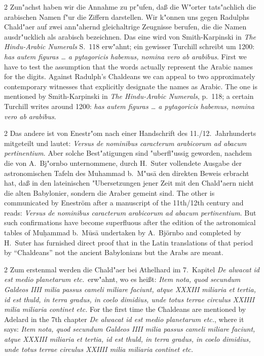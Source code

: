 \documentclass[10pt,a4paper]{article}
\renewcommand{\switchcolumn}{\syncronize\nointerlineskip\columnbreak}
\begin{document}
\begin{paracol}{2}
Zun"achst haben wir die Annahme zu pr"ufen, da\ss{} die W"orter tats"achlich die arabischen Namen f"ur die Ziffern darstellen. Wir k"onnen uns gegen Radulphs Chald"aer auf zwei ann"ahernd gleichaltrige Zeugnisse berufen, die die Namen ausdr"ucklich als arabisch bezeichnen. Das eine wird von Smith-Karpinski in \textit{The Hindu-Arabic Numerals} S.\ 118 erw"ahnt; ein gewisser Turchill schreibt um 1200: \textit{has autem figuras \ldots{} a pytagoricis habemus, nomina vero ab arabibus}.
\switchcolumn
First we have to test the assumption that the words actually represent the Arabic names for the digits. Against Radulph's Chaldeans we can appeal to two approximately contemporary witnesses that explicitly designate the names as Arabic. The one is mentioned by Smith-Karpinski in \textit{The Hindu-Arabic Numerals}, p.\ 118; a certain Turchill writes around 1200: \textit{has autem figuras \ldots{} a pytagoricis habemus, nomina vero ab arabibus}.
\end{paracol}

\begin{paracol}{2}
Das andere ist von Enestr"om nach einer Handschrift des 11./12.\ Jahrhunderts mitgeteilt und lautet: \textit{Versus de nominibus caracterum arabicorum ad abacum pertinentium}. Aber solche Best"atigungen sind "uberfl"ussig geworden, nachdem die von A.\ Bj"ornbo unternommene, durch H.\ Suter vollendete Ausgabe der astronomischen Tafeln des Muhammad b.\ M"us\=a den direkten Beweis erbracht hat, da\ss{} in den lateinischen "Ubersetzungen jener Zeit mit den Chald"aern nicht die alten Babylonier, sondern die Araber gemeint sind.
\switchcolumn
The other is communicated by Enestr\"om after a manuscript of the 11th/12th century and reads: \textit{Versus de nominibus caracterum arabicorum ad abacum pertinentium}. But such confirmations have become superfluous after the edition of the astronomical tables of Mu\d{h}ammad b.\ M\=us\=a undertaken by A.\ Bj\"ornbo and completed by H.\ Suter has furnished direct proof that in the Latin translations of that period by ``Chaldeans'' not the ancient Babylonians but the Arabs are meant.
\end{paracol}

\begin{paracol}{2}
Zum erstenmal werden die Chald"aer bei Athelhard im 7.\ Kapitel \textit{De alwacat id est medio planetarum etc.}\ erw"ahnt, wo es hei\ss{}t: \textit{Item nota, quod secundum Galdeos IIII milia passus cameli miliare faciunt, atque XXXIII miliaria et tertia, id est thuld, in terra gradus, in coelo dimidius, unde totus terrae circulus XXIIII milia miliaria continet etc.}
\switchcolumn
For the first time the Chaldeans are mentioned by Adelard in the 7th chapter \textit{De alwacat id est medio planetarum etc.}, where it says: \textit{Item nota, quod secundum Galdeos IIII milia passus cameli miliare faciunt, atque XXXIII miliaria et tertia, id est thuld, in terra gradus, in coelo dimidius, unde totus terrae circulus XXIIII milia miliaria continet etc.}
\end{paracol}
\end{document}

